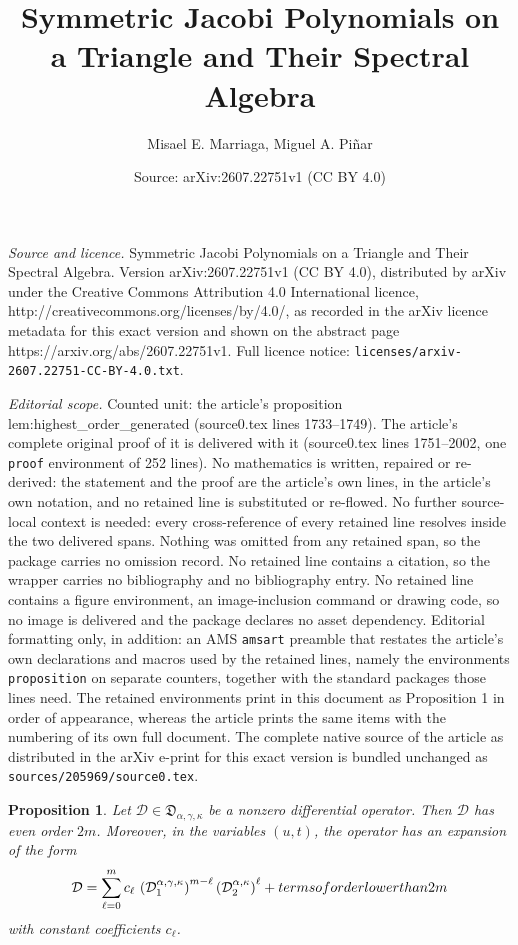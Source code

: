 \documentclass[10pt,a4paper]{amsart}
\title{Symmetric Jacobi Polynomials on a Triangle and Their Spectral Algebra}
\author{Misael E. Marriaga, Miguel A. Pi\~nar}
\date{Source: arXiv:2607.22751v1 (CC BY 4.0)}
\newtheorem{proposition}{Proposition}
\begin{document}
\maketitle

\noindent\emph{Source and licence.} Symmetric Jacobi Polynomials on a Triangle and Their Spectral Algebra. Version arXiv:2607.22751v1 (CC BY 4.0), distributed by arXiv under the Creative Commons Attribution 4.0 International licence, http://creativecommons.org/licenses/by/4.0/, as recorded in the arXiv licence metadata for this exact version and shown on the abstract page https://arxiv.org/abs/2607.22751v1. Full licence notice: \texttt{licenses/arxiv-2607.22751-CC-BY-4.0.txt}.\par\smallskip

\noindent\textit{Editorial scope.} Counted unit: the article's proposition lem:highest\_order\_generated (source0.tex lines 1733--1749). The article's complete original proof of it is delivered with it (source0.tex lines 1751--2002, one \texttt{proof} environment of 252 lines). No mathematics is written, repaired or re-derived: the statement and the proof are the article's own lines, in the article's own notation, and no retained line is substituted or re-flowed.  No further source-local context is needed: every cross-reference of every retained line resolves inside the two delivered spans.  Nothing was omitted from any retained span, so the package carries no omission record.  No retained line contains a citation, so the wrapper carries no bibliography and no bibliography entry.  No retained line contains a figure environment, an image-inclusion command or drawing code, so no image is delivered and the package declares no asset dependency.  Editorial formatting only, in addition: an AMS \texttt{amsart} preamble that restates the article's own declarations and macros used by the retained lines, namely the environments \texttt{proposition} on separate counters, together with the standard packages those lines need.  The retained environments print in this document as Proposition 1 in order of appearance, whereas the article prints the same items with the numbering of its own full document.  The complete native source of the article as distributed in the arXiv e-print for this exact version is bundled unchanged as \texttt{sources/205969/source0.tex}.
\begin{proposition}\label{lem:highest_order_generated}
Let \(\mathcal D\in\mathfrak D_{\alpha,\gamma,\kappa}\) be a nonzero
differential operator. Then \(\mathcal D\) has even order \(2m\).
Moreover, in the variables \((u,t)\), the operator has an expansion of the
form
\begin{equation}\label{eq:highest-order-expansion-generated}
\mathcal D
=
\sum_{\ell=0}^{m}
c_\ell\,
\left(\mathcal D_{1}^{\alpha,\gamma,\kappa}\right)^{m-\ell}
\left(\mathcal D_{2}^{\alpha,\kappa}\right)^{\ell}
+
\textup{terms of order lower than }2m
\end{equation}
with constant coefficients \(c_\ell\).
\end{proposition}
\end{document}
